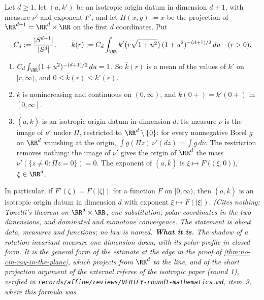 \begin{lemma}
\label{lem:shadow-polar-profile}
\leanok
Let $d \ge 1$, let $(a, k')$ be an isotropic origin datum in dimension $d + 1$, with \Levy{}
measure $\nu'$ and exponent $F'$, and let $\Pi(x,y) := x$ be the projection of
$\RR^{d+1} = \RR^d \times \RR$ on the first $d$ coordinates. Put
\[
  C_d := \frac{|S^{d-1}|}{|S^{d}|}, \qquad
  \bar k(r) := C_d\int_{\RR} k'\bigl(r\sqrt{1+u^2}\bigr)\,(1+u^2)^{-(d+1)/2}\,du \quad (r > 0) .
\]
\begin{enumerate}
\item $C_d\int_{\RR}(1+u^2)^{-(d+1)/2}\,du = 1$. So $\bar k(r)$ is a mean of the values of $k'$
on $[r,\infty)$, and $0 \le \bar k(r) \le k'(r)$.
\item $\bar k$ is nonincreasing and continuous on $(0,\infty)$, and $\bar k(0{+}) = k'(0{+})$ in
$[0,\infty]$.
\item $(a, \bar k)$ is an isotropic origin datum in dimension $d$. Its \Levy{} measure $\bar\nu$
is the image of $\nu'$ under $\Pi$, restricted to $\RR^d \setminus \{0\}$: for every nonnegative
Borel $g$ on $\RR^d$ vanishing at the origin, $\int g(\Pi z)\,\nu'(dz) = \int g\,d\bar\nu$. The
restriction removes nothing: the image of $\nu'$ gives the origin of $\RR^d$ the mass
$\nu'(\{z \ne 0 : \Pi z = 0\}) = 0$. The exponent of $(a,\bar k)$ is
$\xi \mapsto F'\bigl((\xi,0)\bigr)$, $\xi \in \RR^d$.
\end{enumerate}
In particular, if $F'(\zeta) = F(|\zeta|)$ for a function $F$ on $[0,\infty)$, then $(a,\bar k)$
is an isotropic origin datum in dimension $d$ with exponent $\xi \mapsto F(|\xi|)$.
\statusT\quad\emph{(Cites nothing: Tonelli's theorem on $\RR^d \times \RR$, one substitution,
polar coordinates in the two dimensions, and dominated and monotone convergence. The statement is
about data, measures and functions; no law is named. \textbf{What it is.} The shadow of a
rotation-invariant \Levy{} measure one dimension down, with its polar profile in closed form. It
is the general form of the estimate at the edge in the proof of
\ref{thm:no-cin-ray-in-the-plane}, which projects from $\RR^d$ to the line, and of the short
projection argument of the external referee of the isotropic paper (round 1), verified in
\texttt{records/affine/reviews/VERIFY-round1-mathematics.md}, item~9, where this formula was
}
\end{lemma}
